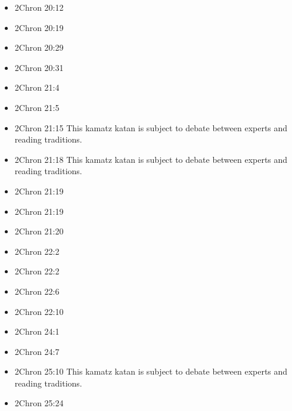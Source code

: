 \documentclass[14pt]{book}
\begin{document}
\begin{multicols}{2}
\begin{itemize}
				\item 2Chron 20:12
				
				\item 2Chron 20:19
				
				\item 2Chron 20:29
				
				\item 2Chron 20:31
				
				\item 2Chron 21:4
				
				\item 2Chron 21:5
				
				\item 2Chron 21:15 This kamatz katan is subject to debate between experts and reading traditions.
				
				\item 2Chron 21:18 This kamatz katan is subject to debate between experts and reading traditions.
				
				\item 2Chron 21:19
				
				\item 2Chron 21:19
				
				\item 2Chron 21:20
				
				\item 2Chron 22:2
				
				\item 2Chron 22:2
				
				\item 2Chron 22:6
				
				\item 2Chron 22:10
				
				\item 2Chron 24:1
				
				\item 2Chron 24:7
				
				\item 2Chron 25:10 This kamatz katan is subject to debate between experts and reading traditions.
				
				\item 2Chron 25:24
				

\end{itemize}
\end{multicols}
\end{document}
